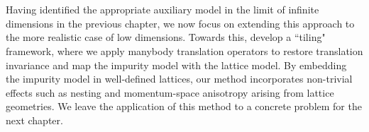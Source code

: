 \chapter{\chapD}\label{sec:tileForm}
Having identified the appropriate auxiliary model in the limit of infinite dimensions in the previous chapter, we now focus on extending this approach to the more realistic case of low dimensions. Towards this, develop a ``tiling" framework, where we apply manybody translation operators to restore translation invariance and map the impurity model with the lattice model. By embedding the impurity model in well-defined lattices, our method incorporates non-trivial effects such as nesting and momentum-space anisotropy arising from lattice geometries. We leave the application of this method to a concrete problem for the next chapter.


